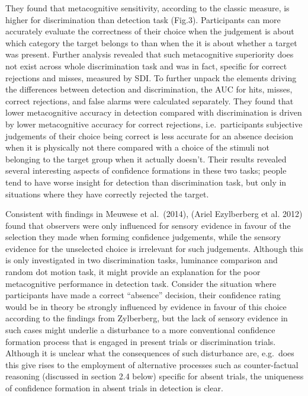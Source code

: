 \documentclass[
]{article}
\begin{document}
They found that metacognitive sensitivity, according to the classic
measure, is higher for discrimination than detection task (Fig.3).
Participants can more accurately evaluate the correctness of their
choice when the judgement is about which category the target belongs to
than when the it is about whether a target was present. Further analysis
revealed that such metacognitive superiority does not exist across whole
discrimination task and was in fact, specific for correct rejections and
misses, measured by SDI. To further unpack the elements driving the
differences between detection and discrimination, the AUC for hits,
misses, correct rejections, and false alarms were calculated separately.
They found that lower metacognitive accuracy in detection compared with
discrimination is driven by lower metacognitive accuracy for correct
rejections, i.e.~participants subjective judgements of their choice
being correct is less accurate for an absence decision when it is
physically not there compared with a choice of the stimuli not belonging
to the target group when it actually doesn't. Their results revealed
several interesting aspects of confidence formations in these two tasks;
people tend to have worse insight for detection than discrimination
task, but only in situations where they have correctly rejected the
target.

Consistent with findings in Meuwese et al.~(2014), (Ariel Ezylberberg et
al. 2012) found that observers were only influenced for sensory evidence
in favour of the selection they made when forming confidence judgements,
while the sensory evidence for the unselected choice is irrelevant for
such judgements. Although this is only investigated in two
discrimination tasks, luminance comparison and random dot motion task,
it might provide an explanation for the poor metacognitive performance
in detection task. Consider the situation where participants have made a
correct ``absence'' decision, their confidence rating would be in theory
be strongly influenced by evidence in favour of this choice according to
the findings from Zylberberg, but the lack of sensory evidence in such
cases might underlie a disturbance to a more conventional confidence
formation process that is engaged in present trials or discrimination
trials. Although it is unclear what the consequences of such disturbance
are, e.g.~does this give rises to the employment of alternative
processes such as counter-factual reasoning (discussed in section 2.4
below) specific for absent trials, the uniqueness of confidence
formation in absent trials in detection is clear.
\end{document}
